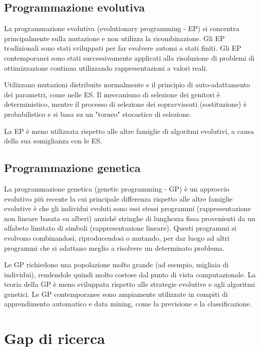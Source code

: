 \subsection{Programmazione evolutiva}

La programmazione evolutiva (evolutionary programming - EP) si concentra principalmente sulla mutazione e non utilizza la ricombinazione. Gli EP tradizionali sono stati sviluppati per far evolvere automi a stati finiti. Gli EP contemporanei sono stati successivamente applicati alla risoluzione di problemi di ottimizzazione continua utilizzando rappresentazioni a valori reali.

Utilizzano mutazioni distribuite normalmente e il principio di auto-adattamento dei parametri, come nelle ES. Il meccanismo di selezione dei genitori è deterministico, mentre il processo di selezione dei sopravvissuti (sostituzione) è probabilistico e si basa su un "torneo" stocastico di selezione.

La EP è meno utilizzata rispetto alle altre famiglie di algoritmi evolutivi, a causa della sua somiglianza con le ES.

\subsection{Programmazione genetica}

La programmazione genetica (genetic programming - GP) è un approccio evolutivo più recente la cui principale differenza rispetto alle altre famiglie evolutive è che gli individui evoluti sono essi stessi programmi (rappresentazione non lineare basata su alberi) anziché stringhe di lunghezza fissa provenienti da un alfabeto limitato di simboli (rappresentazione lineare). Questi programmi si evolvono combinandosi, riproducendosi o mutando, per dar luogo ad altri programmi che si adattano meglio a risolvere un determinato problema.

Le GP richiedono una popolazione molto grande (ad esempio, migliaia di individui), rendendole quindi molto costose dal punto di vista computazionale. La teoria della GP è meno sviluppata rispetto alle strategie evolutive e agli algoritmi genetici. Le GP contemporanee sono ampiamente utilizzate in compiti di apprendimento automatico e data mining, come la previsione e la classificazione.

\section{Gap di ricerca}


